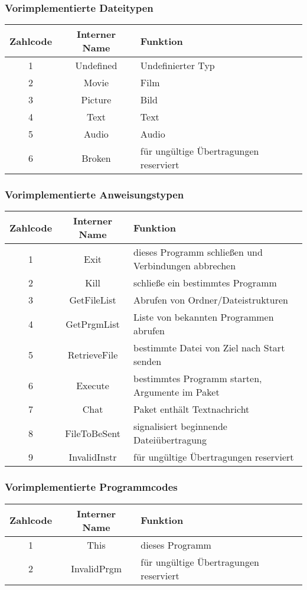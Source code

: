 \subsubsection*{Vorimplementierte Dateitypen}
\begin{tabular}{|c|c|l|}
\hline
Zahlcode & Interner Name & Funktion\\\hline
1 & Undefined & Undefinierter Typ\\\hline
2 & Movie & Film\\\hline
3 & Picture & Bild\\\hline
4 & Text & Text\\\hline
5 & Audio & Audio\\\hline
6 & Broken & für ungültige Übertragungen reserviert\\\hline
\end{tabular}

\subsubsection*{Vorimplementierte Anweisungstypen}
\begin{tabular}{|c|c|l|}
\hline
Zahlcode & Interner Name & Funktion\\\hline
1&    Exit           & dieses Programm schließen und Verbindungen abbrechen\\\hline
2&    Kill           & schließe ein bestimmtes Programm\\\hline
3&    GetFileList    & Abrufen von Ordner/Dateistrukturen\\\hline
4&    GetPrgmList    & Liste von bekannten Programmen abrufen\\\hline
5&    RetrieveFile   & bestimmte Datei von Ziel nach Start senden\\\hline
6&    Execute        & bestimmtes Programm starten, Argumente im Paket\\\hline
7&    Chat           & Paket enthält Textnachricht\\\hline
8&    FileToBeSent   & signalisiert beginnende Dateiübertragung\\\hline
9&    InvalidInstr   & für ungültige Übertragungen reserviert\\\hline
\end{tabular}

\subsubsection*{Vorimplementierte Programmcodes}
\begin{tabular}{|c|c|l|}
\hline
Zahlcode & Interner Name & Funktion\\\hline
1 & This & dieses Programm\\\hline
2 & InvalidPrgm & für ungültige Übertragungen reserviert\\\hline
\end{tabular}